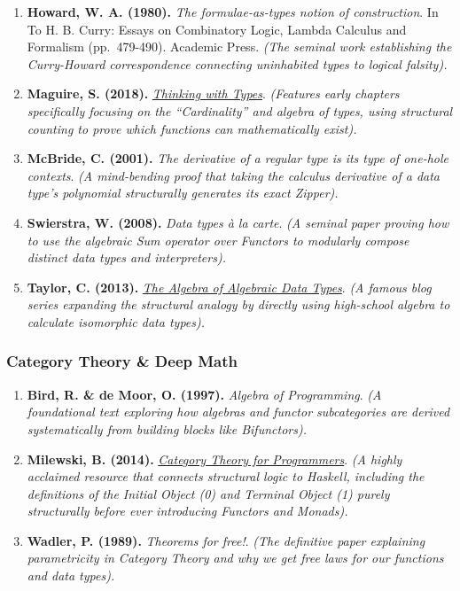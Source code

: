 \documentclass[
]{article}
\providecommand{\tightlist}{%
  \setlength{\itemsep}{0pt}\setlength{\parskip}{0pt}}
\begin{document}
\begin{enumerate}
\def\labelenumi{\arabic{enumi}.}
\tightlist
\item
  \textbf{Howard, W. A. (1980).} \emph{The formulae-as-types notion of
  construction}. In To H. B. Curry: Essays on Combinatory Logic, Lambda
  Calculus and Formalism (pp.~479-490). Academic Press. \emph{(The
  seminal work establishing the Curry-Howard correspondence connecting
  uninhabited types to logical falsity).}
\item
  \textbf{Maguire, S. (2018).}
  \emph{\href{https://thinkingwithtypes.com/}{Thinking with Types}}.
  \emph{(Features early chapters specifically focusing on the
  ``Cardinality'' and algebra of types, using structural counting to
  prove which functions can mathematically exist).}
\item
  \textbf{McBride, C. (2001).} \emph{The derivative of a regular type is
  its type of one-hole contexts}. \emph{(A mind-bending proof that
  taking the calculus derivative of a data type's polynomial
  structurally generates its exact Zipper).}
\item
  \textbf{Swierstra, W. (2008).} \emph{Data types à la carte}. \emph{(A
  seminal paper proving how to use the algebraic Sum operator over
  Functors to modularly compose distinct data types and interpreters).}
\item
  \textbf{Taylor, C. (2013).}
  \emph{\href{https://gist.github.com/gregberns/5e9da0c95a9a8d2b6338afe69310b945}{The
  Algebra of Algebraic Data Types}}. \emph{(A famous blog series
  expanding the structural analogy by directly using high-school algebra
  to calculate isomorphic data types).}
\end{enumerate}

\subsubsection{Category Theory \& Deep
Math}\label{category-theory-deep-math}

\begin{enumerate}
\def\labelenumi{\arabic{enumi}.}
\setcounter{enumi}{5}
\tightlist
\item
  \textbf{Bird, R. \& de Moor, O. (1997).} \emph{Algebra of
  Programming}. \emph{(A foundational text exploring how algebras and
  functor subcategories are derived systematically from building blocks
  like Bifunctors).}
\item
  \textbf{Milewski, B. (2014).}
  \emph{\href{https://bartoszmilewski.com/2014/10/28/category-theory-for-programmers-the-preface/}{Category
  Theory for Programmers}}. \emph{(A highly acclaimed resource that
  connects structural logic to Haskell, including the definitions of the
  Initial Object (0) and Terminal Object (1) purely structurally before
  ever introducing Functors and Monads).}
\item
  \textbf{Wadler, P. (1989).} \emph{Theorems for free!}. \emph{(The
  definitive paper explaining parametricity in Category Theory and why
  we get free laws for our functions and data types).}
\end{enumerate}
\end{document}
